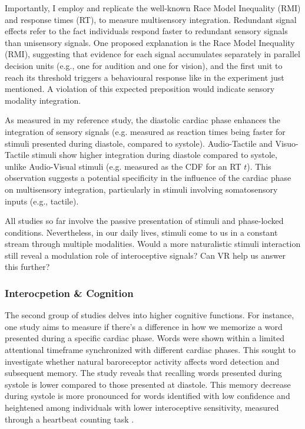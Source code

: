 \documentclass[12pt,oneside,openright]{report}
\begin{document}
Importantly, I employ and replicate the well-known Race Model Inequality (RMI) and response times (RT), to measure multisensory integration. Redundant signal effects refer to the fact individuals respond faster to redundant sensory signals than unisensory signals. One proposed explanation is the Race Model Inequality (RMI), suggesting that evidence for each signal accumulates separately in parallel decision units (e.g., one for audition and one for vision), and the first unit to reach its threshold triggers a behavioural response like in the experiment just mentioned. A violation of this expected preposition would indicate sensory modality integration. 

As measured in my reference study, the diastolic cardiac phase enhances the integration of sensory signals (e.g. measured as reaction times being faster for stimuli presented during diastole, compared
to systole). Audio-Tactile and Visuo-Tactile stimuli show higher integration during diastole compared to systole, unlike Audio-Visual stimuli (e.g. measured as the CDF for an RT $t$). This observation suggests a potential specificity in the influence of the cardiac phase on multisensory integration, particularly in stimuli involving somatosensory inputs (e.g., tactile).

All studies so far involve the passive presentation of stimuli and phase-locked conditions. Nevertheless, in our daily lives, stimuli come to us in a constant stream through multiple modalities. Would a more naturalistic stimuli interaction still reveal a modulation role of interoceptive signals? Can VR help us answer this further?


\subsubsection*{Interocpetion \& Cognition}

The second group of studies delves into higher cognitive functions. For instance, one study aims to measure if there's a difference in how we memorize a word presented during a specific cardiac phase. Words were shown within a limited attentional timeframe synchronized with different cardiac phases. This sought to investigate whether natural baroreceptor activity affects word detection and subsequent memory. The study reveals that recalling words presented during systole is lower compared to those presented at diastole. This memory decrease during systole is more pronounced for words identified with low confidence and heightened among individuals with lower interoceptive sensitivity, measured through a heartbeat counting task \parencite{Garfinkel2013-cy}.
\end{document}
